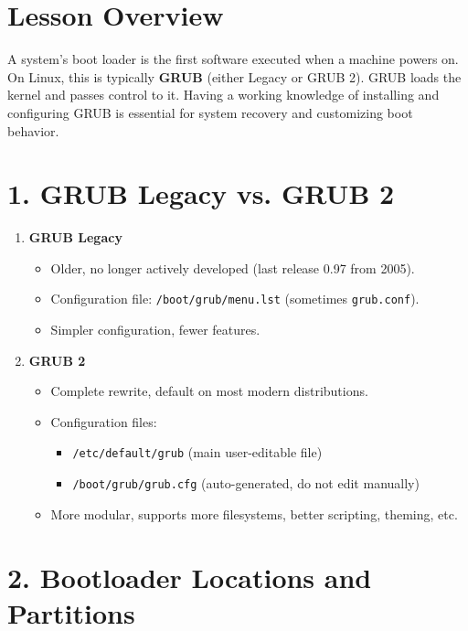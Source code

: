 \documentclass[a4paper]{report}
\begin{document}
\section*{Lesson Overview}

A system’s boot loader is the first software executed when a machine powers on. On Linux, this is typically \textbf{GRUB} (either Legacy or GRUB 2). GRUB loads the kernel and passes control to it. Having a working knowledge of installing and configuring GRUB is essential for system recovery and customizing boot behavior.

\section*{1. GRUB Legacy vs. GRUB 2}

\begin{enumerate}
    \item \textbf{GRUB Legacy}
    \begin{itemize}
        \item Older, no longer actively developed (last release 0.97 from 2005).
        \item Configuration file: \texttt{/boot/grub/menu.lst} (sometimes \texttt{grub.conf}).
        \item Simpler configuration, fewer features.
    \end{itemize}

    \item \textbf{GRUB 2}
    \begin{itemize}
        \item Complete rewrite, default on most modern distributions.
        \item Configuration files:
        \begin{itemize}
            \item \texttt{/etc/default/grub} (main user-editable file)
            \item \texttt{/boot/grub/grub.cfg} (auto-generated, do not edit manually)
        \end{itemize}
        \item More modular, supports more filesystems, better scripting, theming, etc.
    \end{itemize}
\end{enumerate}

\section*{2. Bootloader Locations and Partitions}
\end{document}
